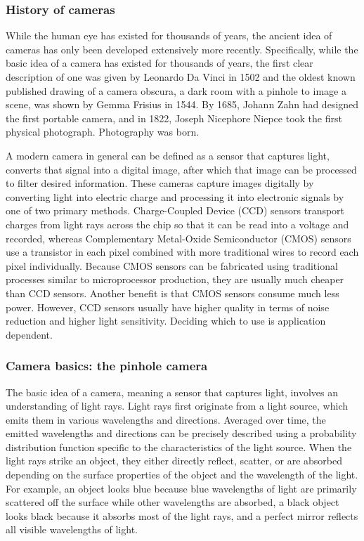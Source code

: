 \documentclass[]{article}
\begin{document}
	\subsubsection{History of cameras}
	
	While the human eye has existed for thousands of years, the ancient idea of cameras has only been developed extensively more recently. Specifically, while the basic idea of a camera has existed for thousands of years, the first clear description of one was given by Leonardo Da Vinci in 1502 and the oldest known published drawing of a camera obscura, a dark room with a pinhole to image a scene, was shown by Gemma Frisius in 1544. By 1685, Johann Zahn had designed the first portable camera, and in 1822, Joseph Nicephore Niepce took the first physical photograph. Photography was born.
	
	A modern camera in general can be defined as a sensor that captures light, converts that signal into a digital image, after which that image can be processed to filter desired information. These cameras capture images digitally by converting light into electric charge and processing it into electronic signals by one of two primary methods. Charge-Coupled Device (CCD) sensors transport charges from light rays across the chip so that it can be read into a voltage and recorded, whereas Complementary Metal-Oxide Semiconductor (CMOS) sensors use a transistor in each pixel combined with more traditional wires to record each pixel individually. Because CMOS sensors can be fabricated using traditional processes similar to microprocessor production, they are usually much cheaper than CCD sensors. Another benefit is that CMOS sensors consume much less power. However, CCD sensors usually have higher quality in terms of noise reduction and higher light sensitivity. Deciding which to use is application dependent.
	
	\subsubsection{Camera basics: the pinhole camera}
	
	The basic idea of a camera, meaning a sensor that captures light, involves an understanding of light rays. Light rays first originate from a light source, which emits them in various wavelengths and directions. Averaged over time, the emitted wavelengths and directions can be precisely described using a probability distribution function specific to the characteristics of the light source. When the light rays strike an object, they either directly reflect, scatter, or are absorbed depending on the surface properties of the object and the wavelength of the light. For example, an object looks blue because blue wavelengths of light are primarily scattered off the surface while other wavelengths are absorbed, a black object looks black because it absorbs most of the light rays, and a perfect mirror reflects all visible wavelengths of light.
	
\end{document}
